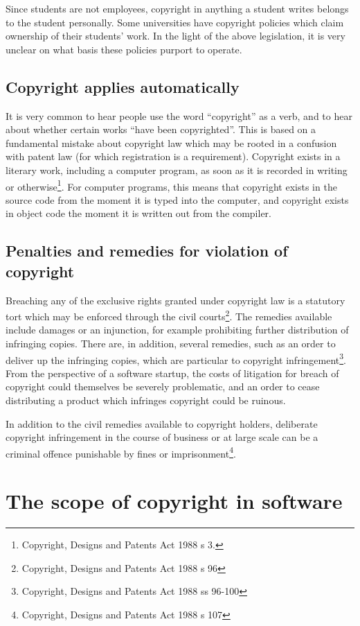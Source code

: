 \documentclass[a4paper,12pt]{article}
\newcommand{\CDPA}[1][]{Copyright, Designs and Patents Act 1988 #1\xspace}
\begin{document}
Since students are not employees, copyright in anything a student writes
belongs to the student personally. Some universities have copyright policies
which claim ownership of their students' work. In the light of the above
legislation, it is very unclear on what basis these policies purport to operate.

\subsection{Copyright applies automatically}

It is very common to hear people use the word ``copyright'' as a verb, and
to hear about whether certain works ``have been copyrighted''. This is based
on a fundamental mistake about copyright law which may be rooted in a
confusion with patent law (for which registration is a
requirement). Copyright exists in a literary work, including a computer
program, as soon as it is recorded in writing or otherwise\footnote{\CDPA[s
  3.]}. For computer programs, this means that copyright exists in the
source code from the moment it is typed into the computer, and copyright
exists in object code the moment it is written out from the compiler. 

\subsection{Penalties and remedies for violation of copyright}

Breaching any of the exclusive rights granted under copyright law is a
statutory tort which may be enforced through the civil
courts\footnote{\CDPA[s 96]}. The remedies available include damages or an
injunction, for example prohibiting further distribution of infringing
copies. There are, in addition, several remedies, such as an order to
deliver up the infringing copies, which are particular to copyright
infringement\footnote{\CDPA[ss 96-100]}. From the perspective of a software
startup, the costs of litigation for breach of copyright could themselves be
severely problematic, and an order to cease distributing a product which
infringes copyright could be ruinous.

In addition to the civil remedies available to copyright holders, deliberate
copyright infringement in the course of business or at large scale can be a
criminal offence punishable by fines or imprisonment\footnote{\CDPA[s 107]}.

\section{The scope of copyright in software}
\end{document}
